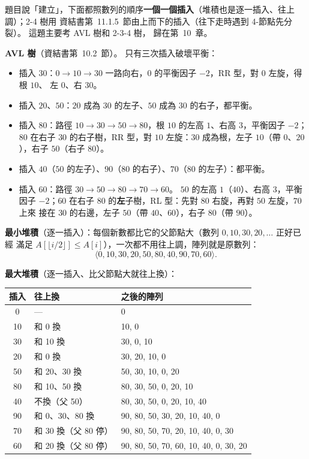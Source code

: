 \begin{pastsoln}
題目說「建立」，下面都照數列的順序\textbf{一個一個插入}（堆積也是逐一插入、往上調）；2-4 樹用
資結書第~11.1.5~節由上而下的插入（往下走時遇到 4-節點先分裂）。 這題主要考 AVL 樹和 2-3-4 樹，
歸在第~10~章。

\textbf{AVL 樹}（資結書第~10.2~節）。 只有三次插入破壞平衡：
\begin{itemize}[nosep]
\item 插入 $30$：$0 \to 10 \to 30$ 一路向右，$0$ 的平衡因子 $-2$，RR 型，對 $0$ 左旋，得根 $10$、
左 $0$、右 $30$。
\item 插入 $20$、$50$：$20$ 成為 $30$ 的左子、$50$ 成為 $30$ 的右子，都平衡。
\item 插入 $80$：路徑 $10 \to 30 \to 50 \to 80$，根 $10$ 的左高 $1$、右高 $3$，平衡因子 $-2$；
$80$ 在右子 $30$ 的右子樹，RR 型，對 $10$ 左旋：$30$ 成為根，左子 $10$（帶 $0$、$20$），右子
$50$（右子 $80$）。
\item 插入 $40$（$50$ 的左子）、$90$（$80$ 的右子）、$70$（$80$ 的左子）：都平衡。
\item 插入 $60$：路徑 $30 \to 50 \to 80 \to 70 \to 60$。 $50$ 的左高 $1$（$40$）、右高 $3$，平衡
因子 $-2$；$60$ 在右子 $80$ 的\textbf{左}子樹，RL 型：先對 $80$ 右旋，再對 $50$ 左旋，$70$ 上來
接在 $30$ 的右邊，左子 $50$（帶 $40$、$60$），右子 $80$（帶 $90$）。
\end{itemize}

\textbf{最小堆積}（逐一插入）：每個新數都比它的父節點大（數列 $0, 10, 30, 20, \ldots$ 正好已經
滿足 $A[\lfloor i/2 \rfloor] \le A[i]$），一次都不用往上調，陣列就是原數列：
\[ \langle 0, 10, 30, 20, 50, 80, 40, 90, 70, 60 \rangle . \]

\textbf{最大堆積}（逐一插入、比父節點大就往上換）：
\begin{center}
\small
\begin{tabular}{cll}
\toprule
插入 & 往上換 & 之後的陣列 \\
\midrule
0 & — & 0 \\
10 & 和 0 換 & 10, 0 \\
30 & 和 10 換 & 30, 0, 10 \\
20 & 和 0 換 & 30, 20, 10, 0 \\
50 & 和 20、30 換 & 50, 30, 10, 0, 20 \\
80 & 和 10、50 換 & 80, 30, 50, 0, 20, 10 \\
40 & 不換（父 50） & 80, 30, 50, 0, 20, 10, 40 \\
90 & 和 0、30、80 換 & 90, 80, 50, 30, 20, 10, 40, 0 \\
70 & 和 30 換（父 80 停） & 90, 80, 50, 70, 20, 10, 40, 0, 30 \\
60 & 和 20 換（父 80 停） & 90, 80, 50, 70, 60, 10, 40, 0, 30, 20 \\
\bottomrule
\end{tabular}
\end{center}


\end{pastsoln}

